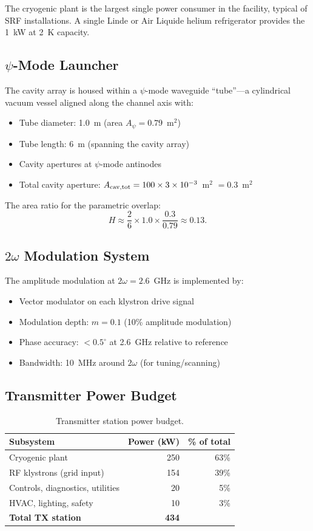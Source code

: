 \documentclass[11pt,letterpaper]{article}
\begin{document}
The cryogenic plant is the largest single power consumer in the
facility, typical of SRF installations. A single Linde or Air Liquide
helium refrigerator provides the 1~kW at 2~K capacity.

\subsection{$\psi$-Mode Launcher}

The cavity array is housed within a $\psi$-mode waveguide ``tube''---a
cylindrical vacuum vessel aligned along the channel axis with:
\begin{itemize}
\item Tube diameter: 1.0~m (area $A_\psi = 0.79$~m$^2$)
\item Tube length: 6~m (spanning the cavity array)
\item Cavity apertures at $\psi$-mode antinodes
\item Total cavity aperture: $A_{\rm cav,tot} = 100 \times 3 \times 10^{-3}$~m$^2$
$= 0.3$~m$^2$
\end{itemize}

The area ratio for the parametric overlap:
\begin{equation}
H \approx \frac{2}{6}\times 1.0 \times \frac{0.3}{0.79} \approx 0.13.
\end{equation}

\subsection{$2\omega$ Modulation System}

The amplitude modulation at $2\omega = 2.6$~GHz is implemented by:
\begin{itemize}
\item Vector modulator on each klystron drive signal
\item Modulation depth: $m = 0.1$ (10\% amplitude modulation)
\item Phase accuracy: $< 0.5^\circ$ at 2.6~GHz relative to reference
\item Bandwidth: 10~MHz around $2\omega$ (for tuning/scanning)
\end{itemize}

\subsection{Transmitter Power Budget}

\begin{table}[H]
\caption{Transmitter station power budget.}
\begin{tabular}{lrr}
\toprule
Subsystem & Power (kW) & \% of total \\
\midrule
Cryogenic plant & 250 & 63\% \\
RF klystrons (grid input) & 154 & 39\% \\
Controls, diagnostics, utilities & 20 & 5\% \\
HVAC, lighting, safety & 10 & 3\% \\
\midrule
\textbf{Total TX station} & \textbf{434} & \\
\bottomrule
\end{tabular}
\end{table}
\end{document}
